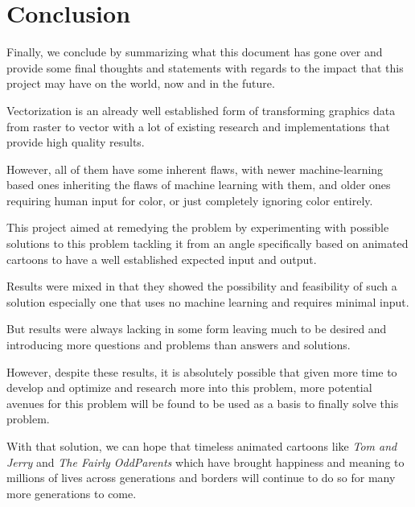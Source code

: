 \documentclass[12pt]{article}
\newcommand{\sentence}{} %
\newcommand{\italic}[1]{\textit{#1}}
\begin{document}
    \pagebreak


    \section{Conclusion}\label{sec:conclusion}

    \tab
    Finally, we conclude by summarizing what this document has gone over and provide some final thoughts and
    statements with regards to the impact that this project may have on the world, now and in the future.
    \sentence
    Vectorization is an already well established form of transforming graphics data from raster to vector with a lot
    of existing research and implementations that provide high quality results.
    \sentence
    However, all of them have some inherent flaws, with newer machine-learning based ones inheriting the flaws of
    machine learning with them, and older ones requiring human input for color, or just completely ignoring color
    entirely.
    \sentence
    This project aimed at remedying the problem by experimenting with possible solutions to this problem tackling it
    from an angle specifically based on animated cartoons to have a well established expected input and output.
    \sentence
    Results were mixed in that they showed the possibility and feasibility of such a solution especially one that
    uses no machine learning and requires minimal input.
    \sentence
    But results were always lacking in some form leaving much to be desired and introducing more questions and
    problems than answers and solutions.
    \sentence
    However, despite these results, it is absolutely possible that given more time to develop and optimize and
    research more into this problem, more potential avenues for this problem will be found to be used as a basis to
    finally solve this problem.
    \sentence
    With that solution, we can hope that timeless animated cartoons like \italic{Tom and Jerry} and \italic{The
    Fairly OddParents} which have brought happiness and meaning to millions of lives across generations and borders
    will continue to do so for many more generations to come.

    \pagebreak

    
    

    \pagebreak
\end{document}
